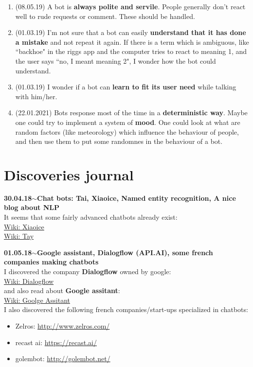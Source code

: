 \documentclass[11pt,a4paper]{article}
\newenvironment{loggentry}[2]%
{\noindent\textbf{#1}\hspace{1cm}$\mathbf{\sim}$\text{ }\textbf{#2}\\}{\vspace{0.5cm}}
\begin{document}
\begin{enumerate}
\item (08.05.19) A bot is \textbf{always polite and servile}. People generally don't react well to rude requests or comment. These should be handled.
\item (01.03.19) I'm not sure that a bot can easily \textbf{understand that it has done a mistake} and not repeat it again. If there is a term which is ambiguous, like ``backhoe" in the riggs app and the computer tries to react to meaning 1, and the user says ``no, I meant meaning 2", I wonder how the bot could understand.
\item (01.03.19) I wonder if a bot can \textbf{learn to fit its user need} while talking with him/her.
\item (22.01.2021) Bots response most of the time in a \textbf{deterministic way}. Maybe one could try to implement a system of \textbf{mood}. One could look at what are random factors (like meteorology) which influence the behaviour of people, and then use them to put some randomnes in the behaviour of a bot.
\end{enumerate}






\section{Discoveries journal}

\begin{loggentry}{30.04.18}{Chat bots: Tai, Xiaoice, Named entity recognition, A nice blog about NLP}
It seems that some fairly advanced chatbots already exist:\\
\href{https://en.wikipedia.org/wiki/Xiaoice}{Wiki: Xiaoice}\\
\href{https://en.wikipedia.org/wiki/Tay_(bot)}{Wiki: Tay}\\
\end{loggentry}

\begin{loggentry}{01.05.18}{Google assistant, Dialogflow (API.AI), some french companies making chatbots}
I discovered the company \textbf{Dialogflow} owned by google:\\
\href{https://en.wikipedia.org/wiki/Dialogflow}{Wiki: Dialogflow}\\
and also read about \textbf{Google assitant}:\\
\href{https://en.wikipedia.org/wiki/Google_Assistant}{Wiki: Goolge Assitant}\\
I also discovered the following french companies/start-ups specialized in chatbots:\\
\begin{itemize}
\item Zelros: \url{http://www.zelros.com/}
\item recast ai: \url{https://recast.ai/}
\item golembot: \url{http://golembot.net/}
\end{itemize}
\end{loggentry}
\end{document}
